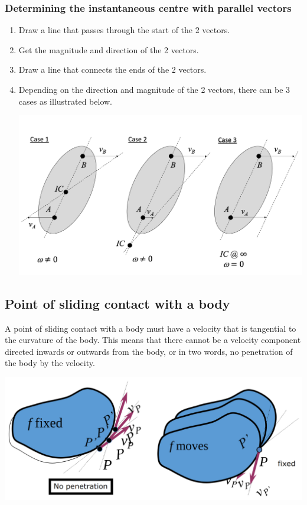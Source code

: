 \documentclass[11pt]{article}
\begin{document}
\subsubsection{Determining the instantaneous centre with parallel vectors}
\label{sec:org23c57c0}
\begin{enumerate}
\item Draw a line that passes through the start of the 2 vectors.
\item Get the magnitude and direction of the 2 vectors.
\item Draw a line that connects the ends of the 2 vectors.
\item Depending on the direction and magnitude of the 2 vectors, there can be 3 cases as illustrated below.
\begin{center}
\includegraphics[width=.9\linewidth]{./images/instantaneous-centre-parallel-vectors.png}
\end{center}
\end{enumerate}
\subsection{Point of sliding contact with a body}
\label{sec:org27e71e4}
A point of sliding contact with a body must have a velocity that is tangential to the curvature of the body. This means that there cannot be a velocity component directed inwards or outwards from the body, or in two words, no penetration of the body by the velocity.

\begin{center}
\includegraphics[width=.9\linewidth]{./images/sliding-contact-of-a-point.png}
\end{center}
\end{document}
